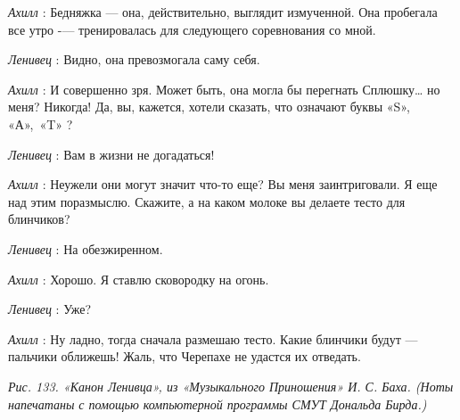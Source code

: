 \emph{Ахилл} : Бедняжка --- она, действительно, выглядит измученной. Она пробегала все утро -\/--- тренировалась для следующего соревнования со мной.

\emph{Ленивец} : Видно, она превозмогала саму себя.

\emph{Ахилл} : И совершенно зря. Может быть, она могла бы перегнать Сплюшку\ldots{} но меня? Никогда! Да, вы, кажется, хотели сказать, что означают буквы «S», «А»,~«T» ?

\emph{Ленивец} : Вам в жизни не догадаться!

\emph{Ахилл} : Неужели они могут значит что-то еще? Вы меня заинтриговали. Я еще над этим поразмыслю. Скажите, а на каком молоке вы делаете тесто для блинчиков?

\emph{Ленивец} : На обезжиренном.

\emph{Ахилл} : Хорошо. Я ставлю сковородку на огонь.

\emph{Ленивец} : Уже?

\emph{Ахилл} : Ну ладно, тогда сначала размешаю тесто. Какие блинчики будут --- пальчики оближешь! Жаль, что Черепахе не удастся их отведать.

\emph{Рис. 133. «Канон Ленивца», из «Музыкального Приношения» И. С. Баха. (Ноты напечатаны с помощью компьютерной программы СМУТ Дональда Бирда.)}

